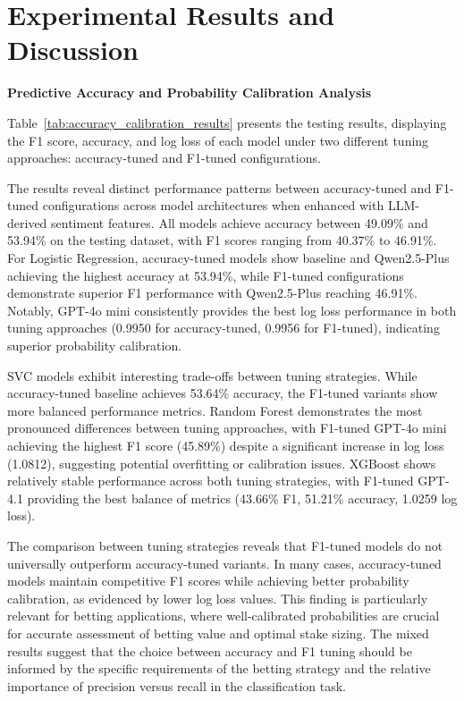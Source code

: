 \documentclass[conference]{IEEEtran}
\begin{document}





\section{Experimental Results and Discussion}

\noindent\textbf{Predictive Accuracy and Probability Calibration Analysis}

Table~\ref{tab:accuracy_calibration_results} presents the testing results, displaying the F1 score, accuracy, and log loss of each model under two different tuning approaches: accuracy-tuned and F1-tuned configurations. 

The results reveal distinct performance patterns between accuracy-tuned and F1-tuned configurations across model architectures when enhanced with LLM-derived sentiment features. All models achieve accuracy between 49.09\% and 53.94\% on the testing dataset, with F1 scores ranging from 40.37\% to 46.91\%. For Logistic Regression, accuracy-tuned models show baseline and Qwen2.5-Plus achieving the highest accuracy at 53.94\%, while F1-tuned configurations demonstrate superior F1 performance with Qwen2.5-Plus reaching 46.91\%. Notably, GPT-4o mini consistently provides the best log loss performance in both tuning approaches (0.9950 for accuracy-tuned, 0.9956 for F1-tuned), indicating superior probability calibration.

SVC models exhibit interesting trade-offs between tuning strategies. While accuracy-tuned baseline achieves 53.64\% accuracy, the F1-tuned variants show more balanced performance metrics. Random Forest demonstrates the most pronounced differences between tuning approaches, with F1-tuned GPT-4o mini achieving the highest F1 score (45.89\%) despite a significant increase in log loss (1.0812), suggesting potential overfitting or calibration issues. XGBoost shows relatively stable performance across both tuning strategies, with F1-tuned GPT-4.1 providing the best balance of metrics (43.66\% F1, 51.21\% accuracy, 1.0259 log loss).

The comparison between tuning strategies reveals that F1-tuned models do not universally outperform accuracy-tuned variants. In many cases, accuracy-tuned models maintain competitive F1 scores while achieving better probability calibration, as evidenced by lower log loss values. This finding is particularly relevant for betting applications, where well-calibrated probabilities are crucial for accurate assessment of betting value and optimal stake sizing. The mixed results suggest that the choice between accuracy and F1 tuning should be informed by the specific requirements of the betting strategy and the relative importance of precision versus recall in the classification task.
\end{document}
